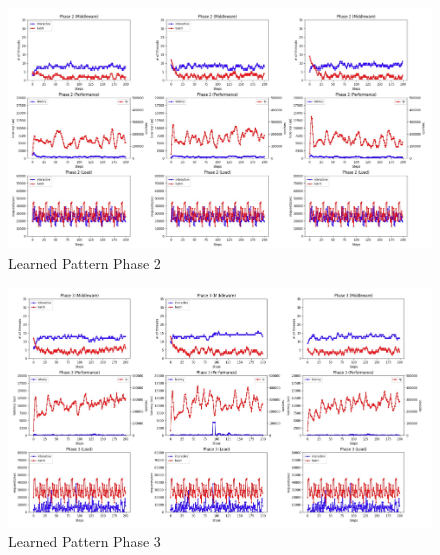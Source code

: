   \begin{figure}[ht]
    \centering
    \includegraphics[width=\textwidth,height=\textheight,keepaspectratio,angle=0]{images/rl-phase-2.png}
    \caption{Learned Pattern Phase 2}
    \label{fig:learned_phase_2}
  \end{figure}

  \begin{figure}[ht]
    \centering
    \includegraphics[width=\textwidth,height=\textheight,keepaspectratio,angle=0]{images/rl-phase-3.png}
    \caption{Learned Pattern Phase 3}
    \label{fig:learned_phase_3}
  \end{figure}